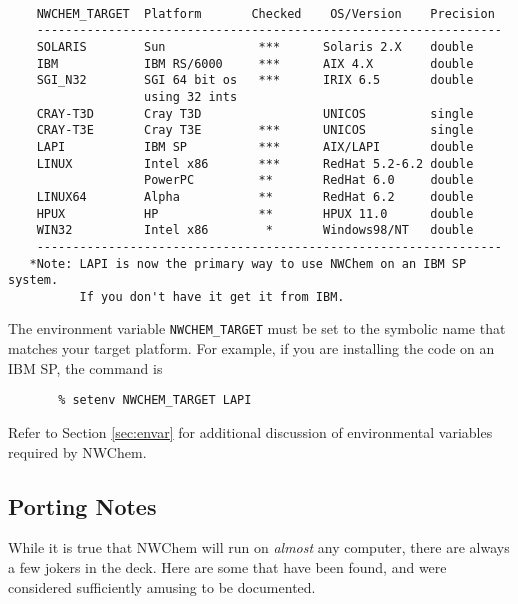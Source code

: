 \begin{verbatim}

    NWCHEM_TARGET  Platform       Checked    OS/Version    Precision
    -----------------------------------------------------------------
    SOLARIS        Sun             ***      Solaris 2.X    double
    IBM            IBM RS/6000     ***      AIX 4.X        double
    SGI_N32        SGI 64 bit os   ***      IRIX 6.5       double
                   using 32 ints
    CRAY-T3D       Cray T3D                 UNICOS         single
    CRAY-T3E       Cray T3E        ***      UNICOS         single
    LAPI           IBM SP          ***      AIX/LAPI       double
    LINUX          Intel x86       ***      RedHat 5.2-6.2 double
                   PowerPC         **       RedHat 6.0     double
    LINUX64        Alpha           **       RedHat 6.2     double
    HPUX           HP              **       HPUX 11.0      double
    WIN32          Intel x86        *       Windows98/NT   double
    -----------------------------------------------------------------
   *Note: LAPI is now the primary way to use NWChem on an IBM SP system.
          If you don't have it get it from IBM. 

\end{verbatim}
The environment variable {\tt NWCHEM\_TARGET} must
be set to the symbolic name
that matches your target platform.  For example, if you are installing
the code on an IBM SP, the command is

\begin{verbatim}
       % setenv NWCHEM_TARGET LAPI
\end{verbatim}

Refer to Section \ref{sec:envar} for additional discussion of environmental variables
required by NWChem.

\subsection{Porting Notes}
\label{sec:PortingNotes}

While it is true that NWChem will run on {\em almost} any computer, there are always
a few jokers in the deck.  Here are some that have been found, and were
considered sufficiently amusing to be documented.

